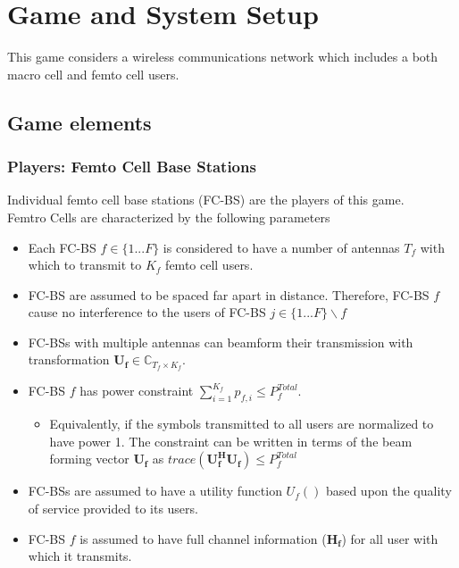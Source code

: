 \documentclass[12pt]{article}
\begin{document}
\section{Game and System Setup}

This game considers a wireless communications network which includes a both macro cell and femto cell users.

\subsection{Game elements}
\subsubsection{Players: Femto Cell Base Stations}


Individual femto cell base stations (FC-BS) are the players of this game.
\\
Femtro Cells are characterized by the following parameters
\begin{itemize}
\item Each FC-BS  $f \in \{1 ... F\}$ is considered to have a number of antennas $T_f$ with which to transmit to $K_f$ femto cell users.
\\
\item FC-BS are assumed to be spaced far apart in distance. Therefore, FC-BS $f$ cause no interference to the users of FC-BS $j \in \{1 ... F\}\backslash f$
\\
\item FC-BSs with multiple antennas can beamform their transmission with transformation $\mathbf{U_f} \in \mathbb{C}_{T_f \times K_f}$.
\\
\item 
FC-BS $f$ has power constraint  $\sum^{K_f}_{i=1} p_{f,i} \leq P^{Total}_{f} $. 
\begin{itemize}
\item Equivalently, if the symbols transmitted to all users are normalized to have power 1. The constraint can be written in terms of the beam forming vector $\mathbf{U_f}$ as $trace(\mathbf{U_f^H}\mathbf{U_f}) \leq P^{Total}_{f}$
\end{itemize}

\item 
FC-BSs are assumed to have a utility function $U_f()$ based upon the quality of service provided to its users.
\\
\item FC-BS $f$ is assumed to have full channel information ($\mathbf{H_f}$) for all user  with which it transmits.
\\
\end{itemize}
\end{document}
